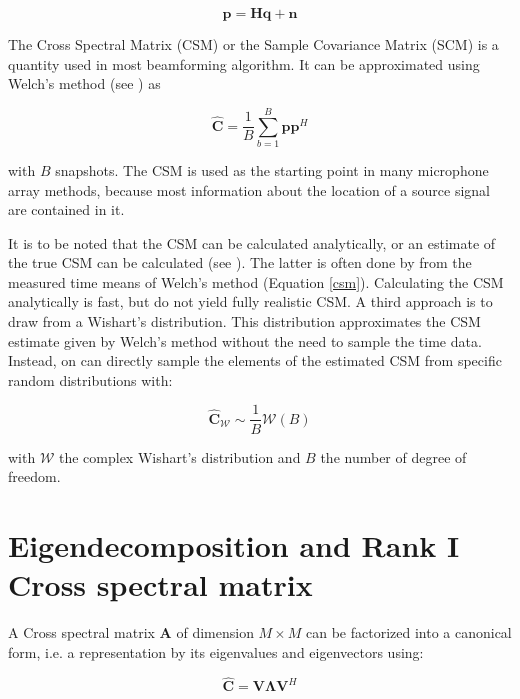 \documentclass[11pt,a4paper,twoside]{report}
\begin{document}
\begin{equation}
    \mathbf{p} = \mathbf{H} \mathbf{q} + \mathbf{n}
\end{equation}

The Cross Spectral Matrix (CSM) or the Sample Covariance Matrix (SCM) is a quantity used in most beamforming algorithm. It can be approximated using Welch's method (see \cite{welch1967use}) as


\begin{equation}
    \label{csm}
    \hat{\mathbf{C}} = \frac{1}{B} \sum_{b = 1}^{B} \mathbf{p}\mathbf{p}^H
\end{equation}

with $B$ snapshots. The CSM is used as the starting point in many microphone array methods, because most information about the location of a source signal are contained in it.

It is to be noted that the CSM can be calculated analytically, or an estimate of the true CSM can be calculated (see \cite{kujawski2022fast}). The latter is often done by from the measured time means of Welch's method (Equation \ref{csm}). Calculating the CSM analytically is fast, but do not yield fully realistic CSM. A third approach is to draw from a Wishart's distribution. This distribution approximates the CSM estimate given by Welch's method without the need to sample the time data. Instead, on can directly sample the elements of the estimated CSM from specific random distributions with:

\begin{equation}
    \hat{\mathbf{C}}_{\mathcal{W}} \sim \frac{1}{B}\mathcal{W}(B)
\end{equation}

with $\mathcal{W}$ the complex Wishart's distribution and $B$ the number of degree of freedom.

\section{Eigendecomposition and Rank I Cross spectral matrix}

A Cross spectral matrix $\mathbf{A}$ of dimension $M \times M$ can be factorized into a canonical form, i.e. a representation by its eigenvalues and eigenvectors using:

\begin{equation}
    \label{eigendecomposition}
    \hat{\mathbf{C}} = \mathbf{V} \mathbf{\Lambda} \mathbf{V}^H
\end{equation}
\end{document}
